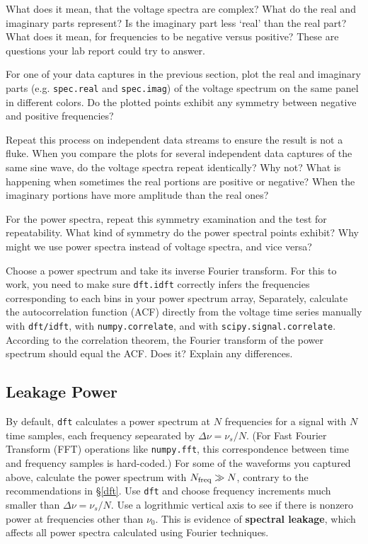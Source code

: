 \documentclass[11pt,preprint]{aastex}
\begin{document}
What does it mean, that the voltage spectra are complex? What do the real
and imaginary parts represent? Is the imaginary part less `real'
than the real part?
What does it mean, for frequencies to be negative versus
positive? These are questions your lab report could try to answer.

For one of your data captures in the previous section, plot the real and imaginary parts
(e.g. {\tt spec.real} and {\tt spec.imag})
of the voltage spectrum on the same panel in different colors.
Do the plotted points 
exhibit any symmetry between negative and positive
frequencies?

Repeat this process on independent data
streams to ensure the result is not a fluke.
When you compare the plots for several independent data captures of the same sine wave, do the
voltage spectra repeat identically?  Why not? What is happening when
sometimes the real portions are positive or negative? When the imaginary
portions have more amplitude than the real ones?

For the power spectra, repeat this symmetry examination and the test for
repeatability. What kind of symmetry do the power spectral points
exhibit? Why might we use power spectra instead of voltage spectra, and vice versa?

Choose a power spectrum and take its inverse Fourier transform.
For this to work, you need to make sure {\tt dft.idft} correctly infers
the frequencies corresponding to each bins in your power spectrum array,
Separately, calculate the autocorrelation function (ACF) directly from 
the voltage time series manually with {\tt dft/idft}, with \verb$numpy.correlate$, and with \verb$scipy.signal.correlate$.
According to the correlation theorem, the Fourier transform
of the power spectrum should equal the ACF. Does it? Explain any differences.

\subsection{Leakage Power} \label{subleakage}

\noindent
By default, \verb$dft$ calculates a power spectrum at $N$ frequencies for a signal with 
$N$ time samples, each frequency sepearated by $\Delta\nu = \nu_s/N$. (For Fast Fourier Transform (FFT)
operations like \verb$numpy.fft$, this correspondence between time and frequency samples is hard-coded.) 
For some of the waveforms you captured above, calculate
the power spectrum with $N_{\rm freq}\gg N$, contrary to the
recommendations in \S \ref{dft}. Use \verb$dft$ and choose 
frequency increments much smaller than $\Delta \nu = \nu_s/N$.
Use a logrithmic vertical axis to see if there is nonzero power at
frequencies other than $\nu_0$.  This
is evidence of {\bf spectral leakage}, which affects all power spectra 
calculated using Fourier techniques. 
\end{document}
